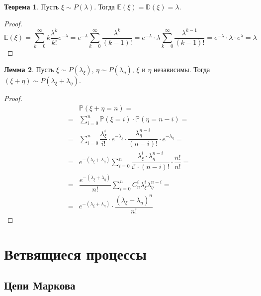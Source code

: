 \documentclass[12pt]{article}
\theoremstyle{definition}
\newtheorem{theorem}{Теорема}[section]
\newtheorem{lemma}[theorem]{Лемма}
\newcommand{\E}{\mathbb{E}}
\newcommand{\D}{\mathbb{D}}
\newcommand{\prob}{\mathbb{P}}
\begin{document}
\begin{theorem}
    Пусть $\xi\sim P(\lambda)$. Тогда $\E(\xi)=\D(\xi)=\lambda$.
\end{theorem}
\begin{proof}
    $$\E(\xi)=\sum_{k=0}^{\infty}k\dfrac{\lambda^k}{k!}e^{-\lambda}=e^{-\lambda}\sum_{k=0}^{\infty}\dfrac{\lambda^k}{(k-1)!}=e^{-\lambda}\cdot\lambda\sum_{k=0}^{\infty}\dfrac{\lambda^{k-1}}{(k-1)!}=e^{-\lambda}\cdot\lambda\cdot e^\lambda=\lambda$$
\end{proof}
\begin{lemma}
    Пусть $\xi\sim P(\lambda_\xi)$, $\eta\sim P(\lambda_\eta)$, $\xi$ и $\eta$ независимы. Тогда $(\xi+\eta)\sim P(\lambda_\xi+\lambda_\eta)$.
\end{lemma}
\begin{proof}
    \begin{align*}
        &\prob(\xi+\eta=n)=\\
        =&\sum_{i=0}^{n}\prob(\xi=i)\cdot\prob(\eta=n-i)=\\
        =&\sum_{i=0}^{n}\dfrac{\lambda_\xi^i}{i!}\cdot e^{-\lambda_\xi}\cdot \dfrac{\lambda_\eta^{n-i}}{(n-i)!}\cdot e^{-\lambda_\eta}=\\
        =&e^{-(\lambda_\xi+\lambda_\eta)}\sum_{i=0}^{n}\dfrac{\lambda_\xi^i\cdot\lambda_\eta^{n-i}}{i!\cdot(n-i)!}\cdot \dfrac{n!}{n!}=\\
        =&\dfrac{e^{-(\lambda_\xi+\lambda_\eta)}}{n!}\sum_{i=0}^{n}C_n^i\lambda_\xi^i\lambda_\eta^{n-i}=\\
        =&e^{-(\lambda_\xi+\lambda_\eta)}\cdot \dfrac{(\lambda_\xi+\lambda_\eta)^n}{n!}
    \end{align*}
\end{proof}

\section{Ветвящиеся процессы}

\subsection{Цепи Маркова}
\end{document}

